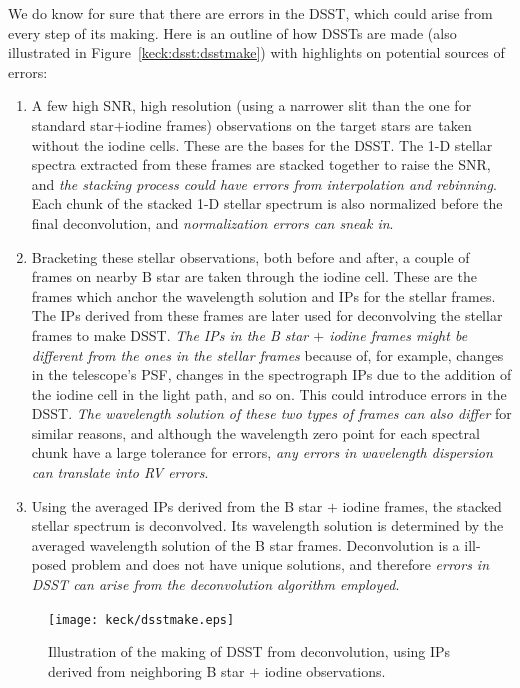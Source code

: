 We do know for sure that there are errors in the DSST, which could
arise from every step of its making. Here is an outline of how DSSTs
are made (also illustrated in Figure~\ref{keck:dsst:dsstmake}) with
highlights on potential sources of errors: 
\begin{enumerate}
\item A few high SNR, high resolution (using a narrower slit than
  the one for standard star$+$iodine frames) observations on the target
  stars are taken without the iodine cells. These are the bases for the
  DSST. The 1-D stellar spectra extracted from these frames are stacked
  together to raise the SNR, and {\em the stacking process could have errors
    from interpolation and rebinning}. Each chunk of the stacked 1-D
  stellar spectrum is also normalized before the final deconvolution,
  and {\em normalization errors can sneak in}.
\item Bracketing these stellar observations, both before and after,
  a couple of frames on nearby B star are taken through the iodine
  cell. These are the frames which anchor the wavelength solution
  and IPs for the stellar frames. The IPs derived from these frames
  are later used for deconvolving the stellar frames to make
  DSST. {\em The IPs in the B star $+$ iodine frames might be different from the
    ones in the stellar frames} because of, for example, changes in the
  telescope's PSF, changes in the spectrograph IPs due to the
  addition of the iodine cell in the light path, and so on. This
  could introduce errors in the DSST. {\em The wavelength solution of
    these two types of frames can also differ} for similar reasons, and
  although the wavelength zero point for each spectral chunk have a
  large tolerance for errors, {\em any errors in wavelength dispersion
  can translate into RV errors}.
\item Using the averaged IPs derived from the B star $+$ iodine
  frames, the stacked stellar spectrum is deconvolved. Its
  wavelength solution is determined by the averaged wavelength
  solution of the B star frames. Deconvolution is a ill-posed
  problem and does not have unique solutions, and therefore {\em errors
    in DSST can arise from the deconvolution algorithm employed}. 
\end{enumerate}

\begin{figure}
\centering
\texttt{[image: keck/dsstmake.eps]}
\caption{Illustration of the making of DSST from deconvolution, using
  IPs derived from neighboring B star $+$ iodine observations.
\label{telluric:fig:dsstmake}}
\end{figure}


